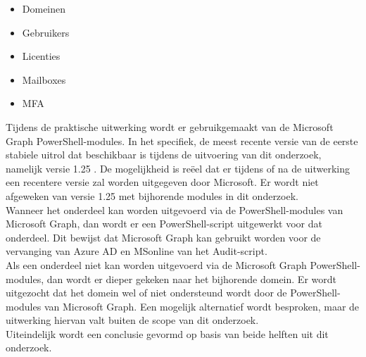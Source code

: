 \begin{itemize}
    \item Domeinen
    \item Gebruikers
    \item Licenties
    \item Mailboxes
    \item \ac{MFA}
\end{itemize}

Tijdens de praktische uitwerking wordt er gebruikgemaakt van de Microsoft Graph PowerShell-modules. In het specifiek, de meest recente versie van de eerste stabiele uitrol dat beschikbaar is tijdens de uitvoering van dit onderzoek, namelijk versie 1.25 \autocite{Microsoft2023k}. De mogelijkheid is reëel dat er tijdens of na de uitwerking een recentere versie zal worden uitgegeven door Microsoft. Er wordt niet afgeweken van versie 1.25 met bijhorende modules in dit onderzoek. \\  

Wanneer het onderdeel kan worden uitgevoerd via de PowerShell-modules van Microsoft Graph, dan wordt er een PowerShell-script uitgewerkt voor dat onderdeel. Dit bewijst dat Microsoft Graph kan gebruikt worden voor de vervanging van Azure \ac{AD} en MSonline van het Audit-script. \\

Als een onderdeel niet kan worden uitgevoerd via de Microsoft Graph PowerShell-modules, dan wordt er dieper gekeken naar het bijhorende domein. Er wordt uitgezocht dat het domein wel of niet ondersteund wordt door de PowerShell-modules van Microsoft Graph. Een mogelijk alternatief wordt besproken, maar de uitwerking hiervan valt buiten de scope van dit onderzoek. \\

Uiteindelijk wordt een conclusie gevormd op basis van beide helften uit dit onderzoek. 